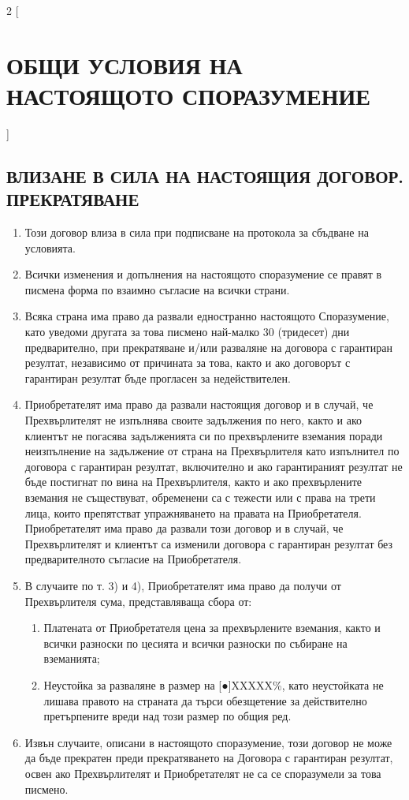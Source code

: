 \begin{multicols}{2} [\section{ОБЩИ УСЛОВИЯ НА НАСТОЯЩОТО
    СПОРАЗУМЕНИЕ}]
  \subsection{ВЛИЗАНЕ В СИЛА НА НАСТОЯЩИЯ ДОГОВОР. ПРЕКРАТЯВАНЕ}
  \begin{enumerate}
  \item Този договор влиза в сила при подписване на протокола за
    сбъдване на условията.
  \item Всички изменения и допълнения на настоящото споразумение се
    правят в писмена форма по взаимно съгласие на всички страни.
  \item Всяка страна има право да развали едностранно настоящото
    Споразумение, като уведоми другата за това писмено най-малко 30
    (тридесет) дни предварително, при прекратяване и/или разваляне на
    договора с гарантиран резултат, независимо от причината за това,
    както и ако договорът с гарантиран резултат бъде прогласен за
    недействителен.
  \item Приобретателят има право да развали настоящия договор и в
    случай, че Прехвърлителят не изпълнява своите задължения по него,
    както и ако клиентът не погасява задълженията си по прехвърлените
    вземания поради неизпълнение на задължение от страна на
    Прехвърлителя като изпълнител по договора с гарантиран резултат,
    включително и ако гарантираният резултат не бъде постигнат по вина
    на Прехвърлителя, както и ако прехвърлените вземания не
    съществуват, обременени са с тежести или с права на трети лица,
    които препятстват упражняването на правата на
    Приобретателя. Приобретателят има право да развали този договор и
    в случай, че Прехвърлителят и клиентът са изменили договора с
    гарантиран резултат без предварителното съгласие на Приобретателя.
  \item В случаите по т. 3) и 4), Приобретателят има право да получи
    от Прехвърлителя сума, представляваща сбора от:
    \begin{enumerate}
    \item Платената от Приобретателя цена за прехвърлените вземания,
      както и всички разноски по цесията и всички разноски по събиране
      на вземанията;
    \item Неустойка за разваляне в размер на [●]XXXXX\%, като
      неустойката не лишава правото на страната да търси обезщетение
      за действително претърпените вреди над този размер по общия ред.
    \end{enumerate}
  \item Извън случаите, описани в настоящото споразумение, този
    договор не може да бъде прекратен преди прекратяването на Договора
    с гарантиран резултат, освен ако Прехвърлителят и Приобретателят
    не са се споразумели за това писмено.


\end{enumerate}
\end{multicols}
